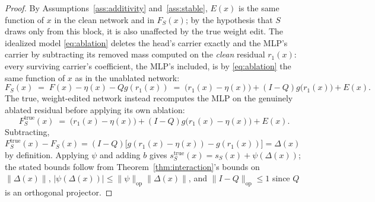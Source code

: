 \documentclass[11pt,a4paper]{article}
\begin{document}
\begin{proof}
By Assumptions~\ref{ass:additivity} and~\ref{ass:stable}, $E(x)$ is the same
function of $x$ in the clean network and in $F_S(x)$; by the hypothesis that
$S$ draws only from this block, it is also unaffected by the true weight
edit. The idealized model \eqref{eq:ablation} deletes the head's carrier
exactly and the MLP's carrier by subtracting its removed mass computed on
the \emph{clean} residual $r_1(x)$: every surviving carrier's coefficient,
the MLP's included, is by \eqref{eq:ablation} the same function of $x$ as in
the unablated network:
\[
F_S(x) \;=\; F(x)-\eta(x)-Qg(r_1(x)) \;=\; \bigl(r_1(x)-\eta(x)\bigr) + (I-Q)g\bigl(r_1(x)\bigr) + E(x).
\]
The true, weight-edited network instead recomputes the MLP on the genuinely
ablated residual before applying its own ablation:
\[
F_S^{\mathrm{true}}(x) \;=\; \bigl(r_1(x)-\eta(x)\bigr) + (I-Q)g\bigl(r_1(x)-\eta(x)\bigr) + E(x).
\]
Subtracting, $F_S^{\mathrm{true}}(x)-F_S(x) = (I-Q)\bigl[g(r_1(x)-\eta(x))-g(r_1(x))\bigr]=\Delta(x)$
by definition. Applying $\psi$ and adding $b$ gives
$s_S^{\mathrm{true}}(x)=s_S(x)+\psi(\Delta(x))$; the stated bounds follow
from Theorem~\ref{thm:interaction}'s bounds on $\|\Delta(x)\|$,
$|\psi(\Delta(x))|\le\|\psi\|_{\mathrm{op}}\|\Delta(x)\|$, and
$\|I-Q\|_{\mathrm{op}}\le1$ since $Q$ is an orthogonal projector.
\end{proof}
\end{document}
